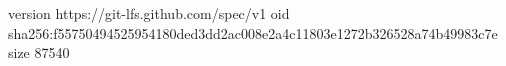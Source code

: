 version https://git-lfs.github.com/spec/v1
oid sha256:f55750494525954180ded3dd2ac008e2a4c11803e1272b326528a74b49983c7e
size 87540
